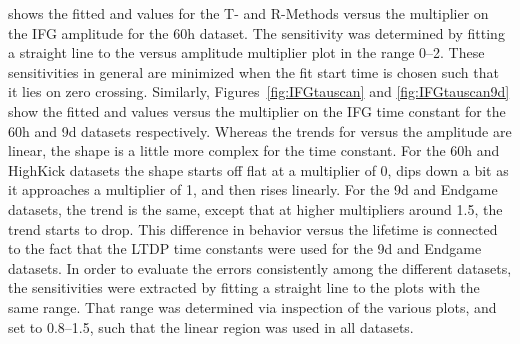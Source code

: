  shows the fitted \R and \chisq values for the T- and R-Methods versus the multiplier on the IFG amplitude for the 60h dataset. The sensitivity was determined by fitting a straight line to the \R versus amplitude multiplier plot in the range 0--2. These sensitivities in general are minimized when the fit start time is chosen such that it lies on \gmtwo zero crossing. Similarly, Figures~\ref{fig:IFGtauscan} and \ref{fig:IFGtauscan9d} show the fitted \R and \chisq values versus the multiplier on the IFG time constant for the 60h and 9d datasets respectively. Whereas the trends for \R versus the amplitude are linear, the shape is a little more complex for the time constant. For the 60h and HighKick datasets the shape starts off flat at a multiplier of 0, dips down a bit as it approaches a multiplier of 1, and then rises linearly. For the 9d and Endgame datasets, the trend is the same, except that at higher multipliers around 1.5, the trend starts to drop. This difference in behavior versus the lifetime is connected to the fact that the LTDP time constants were used for the 9d and Endgame datasets. In order to evaluate the errors consistently among the different datasets, the sensitivities were extracted by fitting a straight line to the plots with the same range. That range was determined via inspection of the various plots, and set to 0.8--1.5, such that the linear region was used in all datasets. 



